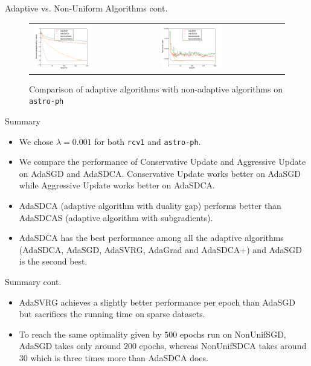 \begin{frame}{Adaptive vs. Non-Uniform Algorithms cont.}
\begin{figure}[htbp]
\begin{tabular}{ll}
    \centering
        \includegraphics[width=0.5\textwidth]{images/comp_all_obej_astro.pdf} &
        \includegraphics[width=0.5\textwidth]{images/comp_all_terror_astro.pdf}
    \end{tabular}
    \caption{Comparison of adaptive algorithms with non-adaptive algorithms on \texttt{astro-ph}} 
    \label{fig:comp_all2}
\end{figure}
\end{frame}


\begin{frame}{Summary}
\begin{itemize}
	\item We chose $\lambda=0.001$ for both \texttt{rcv1} and \texttt{astro-ph}.
	\item We compare the performance of Conservative Update and Aggressive Update on AdaSGD and AdaSDCA. Conservative Update works better on AdaSGD  while Aggressive Update works better on AdaSDCA.
	\item AdaSDCA (adaptive algorithm with duality gap) performs better than AdaSDCAS (adaptive algorithm with subgradients).
	\item AdaSDCA has the best performance among all the adaptive algorithms (AdaSDCA, AdaSGD, AdaSVRG, AdaGrad and AdaSDCA+) and AdaSGD is the second best.
\end{itemize}
\end{frame}
\begin{frame}{Summary cont.}
\begin{itemize}
	\item AdaSVRG achieves a slightly better performance per epoch than AdaSGD but sacrifices the running time on sparse datasets.
	\item To reach the same optimality given by $500$ epochs run on NonUnifSGD, AdaSGD takes only around $200$ epochs, whereas NonUnifSDCA takes around $30$ which is three times more than AdaSDCA does.
\end{itemize}
\end{frame}

